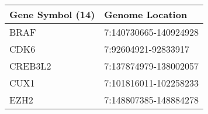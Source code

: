 \begin{tabular}{ll}
\toprule
Gene Symbol (14) &       Genome Location \\
\midrule
            BRAF & 7:140730665-140924928 \\
            CDK6 &   7:92604921-92833917 \\
         CREB3L2 & 7:137874979-138002057 \\
            CUX1 & 7:101816011-102258233 \\
            EZH2 & 7:148807385-148884278 \\
\bottomrule
\end{tabular}
